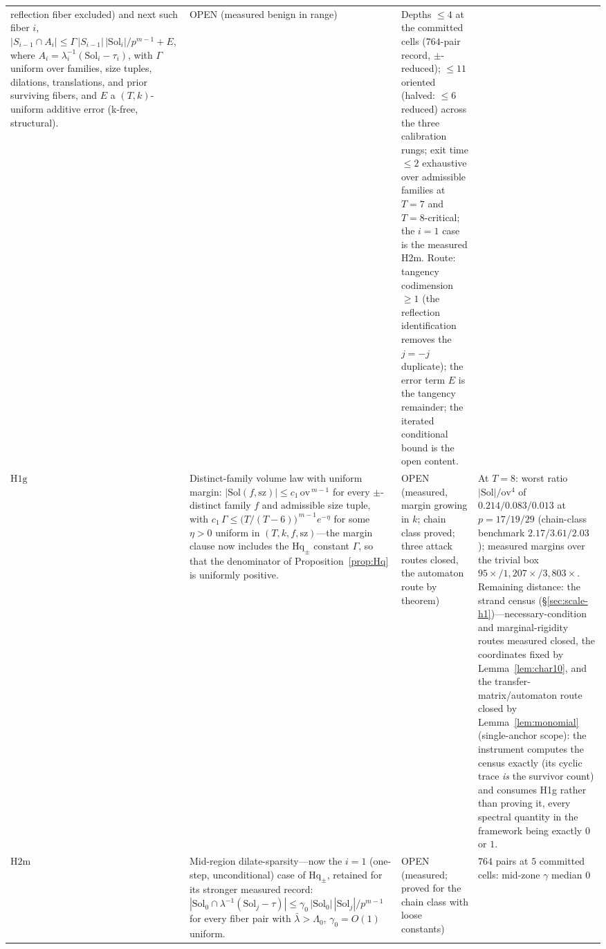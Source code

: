 \documentclass[11pt,a4paper]{article}
\numberwithin{equation}{section}
\theoremstyle{plain}
\theoremstyle{definition}
\theoremstyle{remark}
\begin{document}
{\begin{longtable}{@{}p{}p{}
                   p{}p{}@{}}
reflection fiber excluded) and next such fiber $i$,
$|S_{i-1}\cap A_i|\le\Gamma\,|S_{i-1}|\,|\mathrm{Sol}_i|/p^{m-1}+E$,
where $A_i=\lambda_i^{-1}(\mathrm{Sol}_i-\tau_i)$, with $\Gamma$ uniform over
families, size tuples, dilations, translations, and prior surviving fibers, and
$E$ a $(T,k)$-uniform additive error (k-free, structural). &
OPEN (measured benign in range) &
Depths $\le 4$ at the committed cells ($764$-pair record, $\pm$-reduced);
$\le 11$ oriented (halved: $\le 6$ reduced) across the three calibration rungs;
exit time $\le 2$ exhaustive over admissible families at $T=7$ and $T=8$-critical;
the $i=1$ case is the measured H2m. Route: tangency codimension $\ge 1$ (the
reflection identification removes the $j=-j$ duplicate); the error term $E$ is
the tangency remainder; the iterated conditional bound is the open content. \\
$\mathrm{H1g}$ &
Distinct-family volume law with uniform margin:
$|\mathrm{Sol}(f,\mathrm{sz})|\le c_1\,\mathrm{ov}^{\,m-1}$ for every
$\pm$-distinct family $f$ and admissible size tuple, with
$c_1\,\Gamma\le\bigl(T/(T-6)\bigr)^{\,m-1}e^{-\eta}$ for some $\eta>0$ uniform
in $(T,k,f,\mathrm{sz})$---the margin clause now includes the $\mathrm{Hq}_\pm$
constant $\Gamma$, so that the denominator of Proposition~\ref{prop:Hq} is
uniformly positive. &
OPEN (measured, margin growing in $k$; chain class proved; three
attack routes closed, the automaton route by theorem) &
At $T=8$: worst ratio $|\mathrm{Sol}|/\mathrm{ov}^4$ of
$0.214/0.083/0.013$ at $p=17/19/29$ (chain-class benchmark
$2.17/3.61/2.03$); measured margins over the trivial box
$95\times/1{,}207\times/3{,}803\times$. Remaining distance: the strand
census (\S\ref{sec:scale-h1})---necessary-condition and
marginal-rigidity routes measured closed, the coordinates fixed by
Lemma~\ref{lem:char10}, and the transfer-matrix/automaton route closed
by Lemma~\ref{lem:monomial} (single-anchor scope): the instrument computes
the census exactly (its cyclic trace \emph{is} the survivor count) and
consumes H1g rather than proving it, every spectral quantity in the
framework being exactly $0$ or $1$. \\
$\mathrm{H2m}$ &
Mid-region dilate-sparsity---now the $i=1$ (one-step, unconditional) case of
$\mathrm{Hq}_\pm$, retained for its stronger measured record:
$|\mathrm{Sol}_0\cap\lambda^{-1}(\mathrm{Sol}_j-\tau)|\le
\gamma_0\,|\mathrm{Sol}_0|\,|\mathrm{Sol}_j|/p^{m-1}$ for every fiber
pair with $\bar\lambda>\Lambda_0$, $\gamma_0=O(1)$ uniform. &
OPEN (measured; proved for the chain class with loose constants) &
$764$ pairs at $5$ committed cells: mid-zone $\gamma$ median $0$

\end{longtable}}
\end{document}

